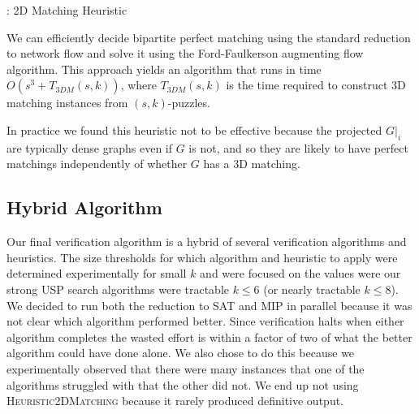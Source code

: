 \documentclass[11pt]{article}
\begin{document}
\begin{algorithm}
  \caption{: 2D Matching Heuristic}
  \label{alg:2dm}
\begin{algorithmic}[1]

  \Else
  \EndIf
  \EndFunction
\end{algorithmic}
\end{algorithm}

We can efficiently decide bipartite perfect matching using the
standard reduction to network flow and solve it using the
Ford-Faulkerson augmenting flow algorithm.  This approach yields an
algorithm that runs in time $O(s^3 + T_{3DM}(s,k))$, where
$T_{3DM}(s,k)$ is the time required to construct 3D matching instances
from $(s,k)$-puzzles.

In practice we found this heuristic not to be effective because the
projected $G|_i$ are typically dense graphs even if $G$ is not, and so
they are likely to have perfect matchings independently of whether $G$
has a 3D matching.



\subsection{Hybrid Algorithm}

Our final verification algorithm is a hybrid of several verification
algorithms and heuristics.  The size thresholds for which algorithm
and heuristic to apply were determined experimentally for small $k$
and were focused on the values were our strong USP search algorithms
were tractable $k \le 6$ (or nearly tractable $k \le 8$).  We decided
to run both the reduction to SAT and MIP in parallel because it was
not clear which algorithm performed better.  Since verification halts
when either algorithm completes the wasted effort is within a factor
of two of what the better algorithm could have done alone.  We also
chose to do this because we experimentally observed that there were
many instances that one of the algorithms struggled with that the
other did not.  We end up not using \textsc{Heuristic2DMatching}
because it rarely produced definitive output.
\end{document}
